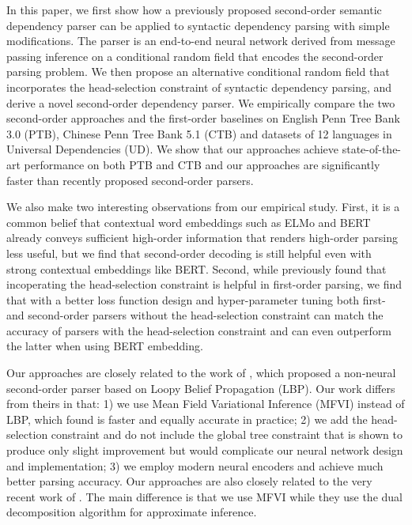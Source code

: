 \documentclass[11pt,a4paper]{article}
\begin{document}
In this paper, we first show how a previously proposed second-order semantic dependency parser \cite{wang-etal-2019-second} can be applied to syntactic dependency parsing with simple modifications. The parser is an end-to-end neural network derived from message passing inference on a conditional random field that encodes the second-order parsing problem. We then propose an alternative conditional random field that incorporates the head-selection constraint of syntactic dependency parsing, and derive a novel second-order dependency parser. We empirically compare the two second-order approaches and the first-order baselines on English Penn Tree Bank 3.0 (PTB), Chinese Penn Tree Bank 5.1 (CTB) and datasets of 12 languages in Universal Dependencies (UD). We show that our approaches achieve state-of-the-art performance on both PTB and CTB and our approaches are significantly faster than recently proposed second-order parsers. 

We also make two interesting observations from our empirical study. First, it is a common belief that contextual word embeddings such as ELMo \cite{peters-etal-2018-deep} and BERT \cite{devlin-etal-2019-bert} already conveys sufficient high-order information that renders high-order parsing less useful, but we find that second-order decoding is still helpful even with strong contextual embeddings like BERT. Second, while \citet{zhang-etal-2019-empirical} previously found that incoperating the head-selection constraint is helpful in first-order parsing, we find that with a better loss function design and hyper-parameter tuning both first- and second-order parsers without the head-selection constraint can match the accuracy of parsers with the head-selection constraint and can even outperform the latter when using BERT embedding.

Our approaches are closely related to the work of \citet{gormley-etal-2015-approximation}, which proposed a non-neural second-order parser based on Loopy Belief Propagation (LBP). Our work differs from theirs in that: 1) we use Mean Field Variational Inference (MFVI) instead of LBP, which \citet{wang-etal-2019-second} found is faster and equally accurate in practice; 2) we add the head-selection constraint and do not include the global tree constraint that is shown to produce only slight improvement \cite{zhang-etal-2019-empirical} but would complicate our neural network design and implementation; 3) we employ modern neural encoders and achieve much better parsing accuracy. Our approaches are also closely related to the very recent work of \citet{turbo2020}. The main difference is that we use MFVI while they use the dual decomposition algorithm  \citep{martins-etal-2011-dual,martins-etal-2013-turning} for approximate inference.
\end{document}
